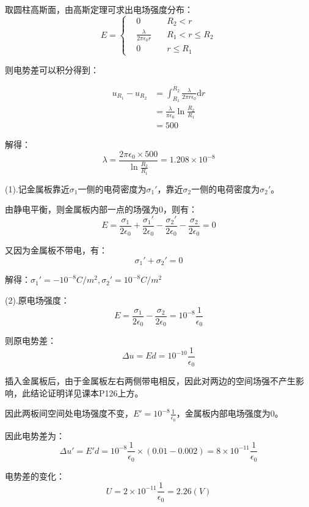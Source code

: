 \documentclass[b5paper,opensource]{qyxf-book}
\newcommand{\di}[1]{\mathrm{d}#1}
\begin{document}

\solve 取圆柱高斯面，由高斯定理可求出电场强度分布：
\begin{equation}
E=\left\{
\begin{aligned}
&0\quad &R_2<r\\
&\frac{\lambda}{2\pi\epsilon_0 r}\quad &R_1<r\leqslant R_2\\
&0	&r\leqslant R_1
\end{aligned}
\right.
\end{equation}

则电势差可以积分得到：

\begin{align*}
u_{R_1}-u_{R_2}&=\int_{R_1}^{R_2} \frac{\lambda}{2\pi r\epsilon_0} \di{r}\\
&=\frac{\lambda}{\pi\epsilon_0}\ln\frac{R_2}{R_1}\\
&=500
\end{align*}


解得：
\[\lambda=\frac{2\pi\epsilon_0\times 500}{\ln\frac{R_2}{R_1}}=1.208\times 10^{-8}\]


\solve 
(1).记金属板靠近$ \sigma_1 $一侧的电荷密度为$ \sigma_1' $，靠近$ \sigma_2 $一侧的电荷密度为$ \sigma_2' $。

由静电平衡，则金属板内部一点的场强为$ 0 $，则有：
\[E=\frac{\sigma_1}{2\epsilon_0}+\frac{\sigma_1'}{2\epsilon_0}-\frac{\sigma_2'}{2\epsilon_0}-\frac{\sigma_2}{2\epsilon_0}=0\]

又因为金属板不带电，有：
\[\sigma_1'+\sigma_2'=0\]

解得：$\sigma_1'=-10^{-8}C/m^2,\sigma_2'=10^{-8}C/m^2$

(2).原电场强度：
\[E=\frac{\sigma_1}{2\epsilon_0}-\frac{\sigma_2}{2\epsilon_0}=10^{-8}\frac{1}{\epsilon_0}\]

则原电势差：
\[\Delta u=Ed=10^{-10}\frac{1}{\epsilon_0}\]

插入金属板后，由于金属板左右两侧带电相反，因此对两边的空间场强不产生影响，此结论证明详见课本P126上方。

因此两板间空间处电场强度不变，$ E'=10^{-8}\frac{1}{\epsilon_0} $，金属板内部电场强度为$ 0 $。

因此电势差为：
\[\Delta u'=E'd=10^{-8}\frac{1}{\epsilon_0}\times(0.01-0.002)=8\times 10^{-11}\frac{1}{\epsilon_0}\]

电势差的变化：
\[U=2\times10^{-11}\frac{1}{\epsilon_0}=2.26(V)\]
\end{document}
